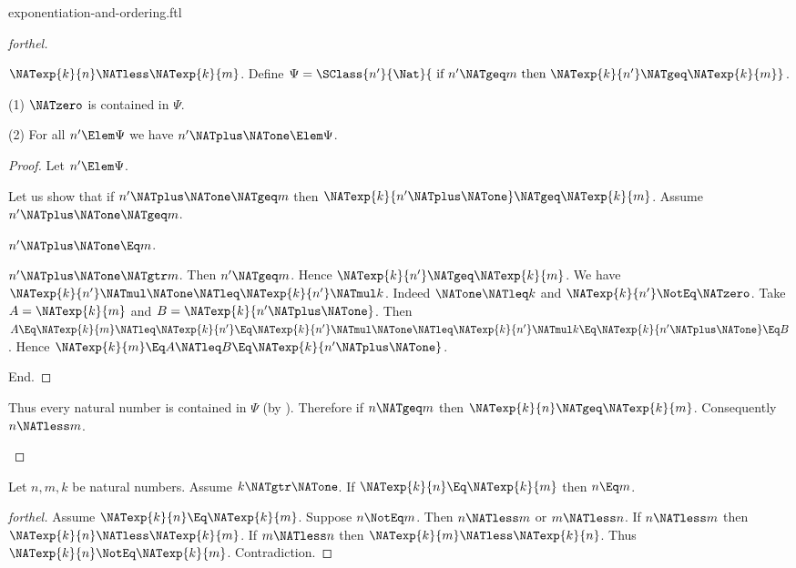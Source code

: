 \documentclass{stex}
\begin{document}
\begin{smodule}{exponentiation-and-ordering.ftl}
\begin{proof}[forthel]
  \begin{case}{$\NATexp{k}{n} \NATless \NATexp{k}{m}$.}
    Define $\Psi = \SClass{n'}{\Nat}{\text{ if }n' \NATgeq m\text{ then }
    \NATexp{k}{n'} \NATgeq \NATexp{k}{m}}$.

    (1) $\NATzero$ is contained in $\Psi$.

    (2) For all $n' \Elem \Psi$ we have $n' \NATplus \NATone \Elem \Psi$.
    \begin{proof}
      Let $n' \Elem \Psi$.

      Let us show that if $n' \NATplus \NATone \NATgeq m$ then $\NATexp{k}{n' \NATplus \NATone} \NATgeq \NATexp{k}{m}$.
        Assume $n' \NATplus \NATone \NATgeq m$.

        \begin{case}{$n' \NATplus \NATone \Eq m$.} \end{case}

        \begin{case}{$n' \NATplus \NATone \NATgtr m$.}
          Then $n' \NATgeq m$.
          Hence $\NATexp{k}{n'} \NATgeq \NATexp{k}{m}$.
          We have $\NATexp{k}{n'} \NATmul \NATone \NATleq \NATexp{k}{n'} \NATmul k$.
          Indeed $\NATone \NATleq k$ and $\NATexp{k}{n'} \NotEq \NATzero$.
          Take $A = \NATexp{k}{m}$ and $B = \NATexp{k}{n' \NATplus \NATone}$. %
          Then $A
            \Eq \NATexp{k}{m}
            \NATleq \NATexp{k}{n'}
            \Eq \NATexp{k}{n'} \NATmul \NATone
            \NATleq \NATexp{k}{n'} \NATmul k
            \Eq \NATexp{k}{n' \NATplus \NATone}
            \Eq B$.
          Hence $\NATexp{k}{m} \Eq A \NATleq B \Eq \NATexp{k}{n' \NATplus \NATone}$.
        \end{case}
      End.
    \end{proof}

    Thus every natural number is contained in $\Psi$ (by ).
    Therefore if $n \NATgeq m$ then $\NATexp{k}{n} \NATgeq \NATexp{k}{m}$.
    Consequently $n \NATless m$.
  \end{case}
\end{proof}

\begin{corollary}[forthel,id=ARITHMETIC_09_6780506905509888]
  Let $n, m, k$ be natural numbers.
  Assume $k \NATgtr \NATone$.
  If $\NATexp{k}{n} \Eq \NATexp{k}{m}$ then $n \Eq m$.
\end{corollary}
\begin{proof}[forthel]
  Assume $\NATexp{k}{n} \Eq \NATexp{k}{m}$.
  Suppose $n \NotEq m$.
  Then $n \NATless m$ or $m \NATless n$.
  If $n \NATless m$ then $\NATexp{k}{n} \NATless \NATexp{k}{m}$.
  If $m \NATless n$ then $\NATexp{k}{m} \NATless \NATexp{k}{n}$.
  Thus $\NATexp{k}{n} \NotEq \NATexp{k}{m}$.
  Contradiction.
\end{proof}


\end{smodule}
\end{document}
